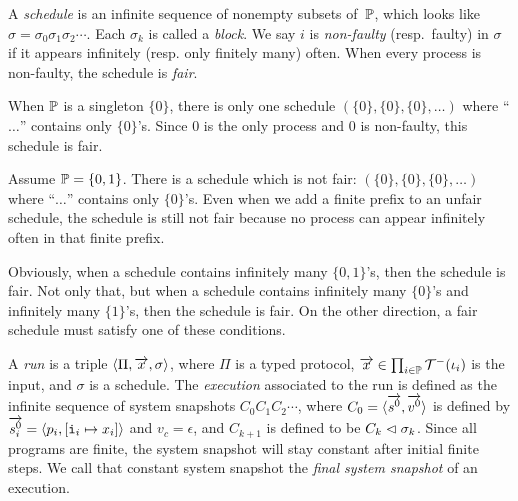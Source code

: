 A \textit{schedule} is an infinite sequence of nonempty subsets
of~$\mathbb{P}$,
which looks like $\sigma = \sigma_0\sigma_1\sigma_2\cdots$.
Each $\sigma_k$ is called a \textit{block}.
We say $i$ is \textit{non-faulty} (resp.~faulty) in
$\sigma$ if it appears infinitely (resp. only finitely many) often.
When every process is non-faulty, the schedule is \textit{fair}.
 \begin{example}
  \label{ex:schedules}
  When $\mathbb{P}$ is a singleton $\{0\}$, there is only one schedule
  $(\{0\},\{0\},\{0\},\ldots)$ where ``$\ldots$'' contains only $\{0\}$'s.
  Since 0 is the only process and 0 is non-faulty, this schedule is fair.

  Assume $\mathbb{P} = \{0,1\}$.
  There is a schedule which is not fair: $(\{0\}, \{0\}, \{0\}, \ldots)$
  where ``$\ldots$'' contains only $\{0\}$'s.
  Even when we add a finite prefix to an unfair schedule, the schedule
  is still not fair because no process can appear infinitely often in that
  finite prefix.

  Obviously, when a schedule contains infinitely many
  $\{0,1\}$'s, then the schedule is fair.  Not only that, but when a
  schedule contains infinitely many $\{0\}$'s and infinitely many $\{1\}$'s,
  then the schedule is fair.  On the other direction, a fair schedule
  must satisfy one of these conditions.
 \end{example}

A \textit{run} is a triple $\langle{\Pi, \overrightarrow x, \sigma}\rangle$,
where $\Pi$ is a typed protocol,
$\overrightarrow x \in \prod_{i\in \mathbb{P}} \mathcal{T}^-(\iota_i)$ is the input,
and $\sigma$ is a schedule.
The \textit{execution} associated to the run
is defined as the infinite sequence of system snapshots
$C_0C_1C_2\cdots$, where $C_0 = \langle{\overrightarrow{s^0}, \overrightarrow{v^0}}\rangle$ is
defined by $\overrightarrow{s^0_i} = \langle{p_i, [\texttt{i}_i\mapsto x_i]}\rangle$ and
$v_c = \epsilon$, and $C_{k+1}$ is defined to be $C_{k}\vartriangleleft\sigma_{k}$.
Since all programs are finite, the system snapshot will stay constant
after initial finite steps.  We call that constant system snapshot the
\textit{final system snapshot} of an execution.

